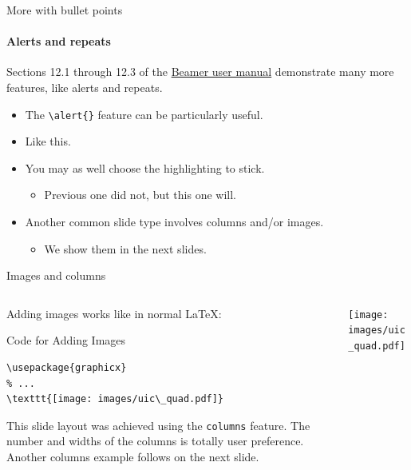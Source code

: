 \documentclass{beamer}
\newcommand{\hrefcol}[2]{\textcolor{uihteal}{\href{#1}{#2}}}
\begin{document}
\begin{frame}[fragile]{More with bullet points}
\framesubtitle{Alerts and repeats}
Sections 12.1 through 12.3 of the \hrefcol{https://www.ctan.org/tex-archive/macros/latex/contrib/beamer/doc/beameruserguide.pdf}{Beamer user
manual} demonstrate many more features, like alerts and repeats.
\begin{itemize}
\item The \verb|\alert{}| feature can be particularly useful.
\item Like \alert<2>{this}.
\item You may as well choose the highlighting to stick.
    \begin{itemize}
    \item Previous one did not, but \alert<3->{this one} will.
    \end{itemize}
\item Another common slide type involves columns and/or images.
    \begin{itemize}
    \item We show them in the \alert<4>{next slides}.
    \end{itemize}
\end{itemize}
\end{frame}


\begin{frame}[fragile]{Images and columns}
\begin{columns}
\begin{column}{0.7\textwidth}
Adding images works like in normal \LaTeX:
\begin{block}{Code for Adding Images}
\begin{verbatim}
\usepackage{graphicx}
% ...
\texttt{[image: images/uic\_quad.pdf]}
\end{verbatim}
\end{block}
This slide layout was achieved using the \verb|columns| feature. The number and widths of the columns is totally user preference. Another columns example follows on the next slide.
\end{column}
\begin{column}{0.3\textwidth}
\texttt{[image: images/uic\_quad.pdf]}
\end{column}
\end{columns}
\end{frame}
\end{document}
